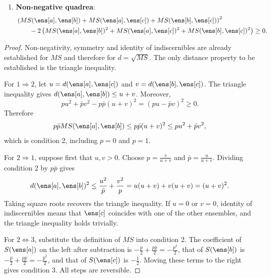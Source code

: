 \begin{prop}
\begin{enumerate}
		\item \textbf{Non-negative quadrea}:
		\begin{equation}
			\begin{aligned}
				&\left(MS(\ens[a],\ens[b])+MS(\ens[a],\ens[c])+MS(\ens[b],\ens[c])\right)^2\\
				&\qquad-2\left(MS(\ens[a],\ens[b])^2+MS(\ens[a],\ens[c])^2+MS(\ens[b],\ens[c])^2\right)\geq0.
			\end{aligned}
		\end{equation}
	\end{enumerate}
\end{prop}

\begin{proof}
	Non-negativity, symmetry and identity of indiscernibles are already established for $MS$ and therefore for $d=\sqrt{MS}$. The only distance property to be established is the triangle inequality.
	
	For $1\Rightarrow2$, let $u=d(\ens[a],\ens[c])$ and $v=d(\ens[b],\ens[c])$. The triangle inequality gives $d(\ens[a],\ens[b])\leq u+v$. Moreover,
	\begin{equation}
		pu^2+\bar{p}v^2-p\bar{p}(u+v)^2=(pu-\bar{p}v)^2\geq0.
	\end{equation}
	Therefore
	\begin{equation}
		p\bar{p}MS(\ens[a],\ens[b])\leq p\bar{p}(u+v)^2\leq pu^2+\bar{p}v^2,
	\end{equation}
	which is condition 2, including $p=0$ and $p=1$.
	
	For $2\Rightarrow1$, suppose first that $u,v>0$. Choose $p=\frac{v}{u+v}$ and $\bar{p}=\frac{u}{u+v}$. Dividing condition 2 by $p\bar{p}$ gives
	\begin{equation}
		d(\ens[a],\ens[b])^2\leq\frac{u^2}{\bar{p}}+\frac{v^2}{p}
		=u(u+v)+v(u+v)=(u+v)^2.
	\end{equation}
	Taking square roots recovers the triangle inequality. If $u=0$ or $v=0$, identity of indiscernibles means that $\ens[c]$ coincides with one of the other ensembles, and the triangle inequality holds trivially.
	
	For $2\Leftrightarrow3$, substitute the definition of $MS$ into condition 2. The coefficient of $S(\ens[a])$ on the left after subtraction is $-\frac{p}{2}+\frac{p\bar{p}}{2}=-\frac{p^2}{2}$, that of $S(\ens[b])$ is $-\frac{\bar{p}}{2}+\frac{p\bar{p}}{2}=-\frac{\bar{p}^2}{2}$, and that of $S(\ens[c])$ is $-\frac{1}{2}$. Moving these terms to the right gives condition 3. All steps are reversible.
	

\end{proof}
